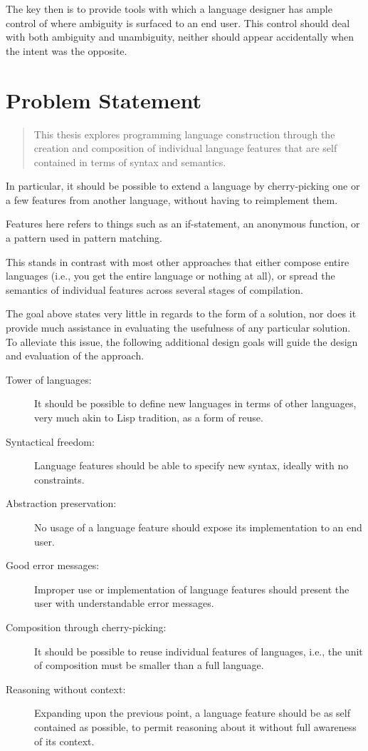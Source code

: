 \documentclass{kththesis}
\begin{document}
The key then is to provide tools with which a language designer has ample control of where ambiguity is surfaced to an end user. This control should deal with both ambiguity and unambiguity, neither should appear accidentally when the intent was the opposite.

\section{Problem Statement} \label{sec:research-question}

\begin{quote}
This thesis explores programming language construction through the creation and composition of individual language features that are self contained in terms of syntax and semantics.
\end{quote}

In particular, it should be possible to extend a language by cherry-picking one or a few features from another language, without having to reimplement them.

Features here refers to things such as an if-statement, an anonymous function, or a pattern used in pattern matching.

This stands in contrast with most other approaches that either compose entire languages (i.e., you get the entire language or nothing at all), or spread the semantics of individual features across several stages of compilation.

The goal above states very little in regards to the form of a solution, nor does it provide much assistance in evaluating the usefulness of any particular solution. To alleviate this issue, the following additional design goals will guide the design and evaluation of the approach.

\begin{description}
  \item[Tower of languages:] It should be possible to define new languages in terms of other languages, very much akin to Lisp tradition, as a form of reuse.
  \item[Syntactical freedom:] Language features should be able to specify new syntax, ideally with no constraints.
  \item[Abstraction preservation:] No usage of a language feature should expose its implementation to an end user.
  \item[Good error messages:] Improper use or implementation of language features should present the user with understandable error messages.
  \item[Composition through cherry-picking:] It should be possible to reuse individual features of languages, i.e., the unit of composition must be smaller than a full language.
  \item[Reasoning without context:] Expanding upon the previous point, a language feature should be as self contained as possible, to permit reasoning about it without full awareness of its context.
\end{description}
\end{document}
